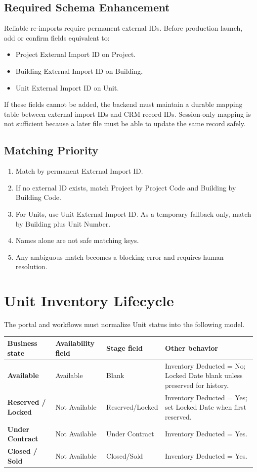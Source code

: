 \documentclass[10pt]{article}
\begin{document}
\subsection{Required Schema Enhancement}
Reliable re-imports require permanent external IDs. Before production launch, add or confirm fields equivalent to:
\begin{itemize}
\item Project External Import ID on Project.
\item Building External Import ID on Building.
\item Unit External Import ID on Unit.
\end{itemize}

If these fields cannot be added, the backend must maintain a durable mapping table between external import IDs and CRM record IDs. Session-only mapping is not sufficient because a later file must be able to update the same record safely.

\subsection{Matching Priority}
\begin{enumerate}
\item Match by permanent External Import ID.
\item If no external ID exists, match Project by Project Code and Building by Building Code.
\item For Units, use Unit External Import ID. As a temporary fallback only, match by Building plus Unit Number.
\item Names alone are not safe matching keys.
\item Any ambiguous match becomes a blocking error and requires human resolution.
\end{enumerate}

\section{Unit Inventory Lifecycle}
The portal and workflows must normalize Unit status into the following model.

\begin{tabularx}{\linewidth}{>{\bfseries}p{1.35in}p{1.4in}p{1.35in}X}
\toprule
Business state & Availability field & Stage field & Other behavior\\
\midrule
Available & Available & Blank & Inventory Deducted = No; Locked Date blank unless preserved for history.\\
Reserved / Locked & Not Available & Reserved/Locked & Inventory Deducted = Yes; set Locked Date when first reserved.\\
Under Contract & Not Available & Under Contract & Inventory Deducted = Yes.\\
Closed / Sold & Not Available & Closed/Sold & Inventory Deducted = Yes.\\
\bottomrule
\end{tabularx}
\end{document}
